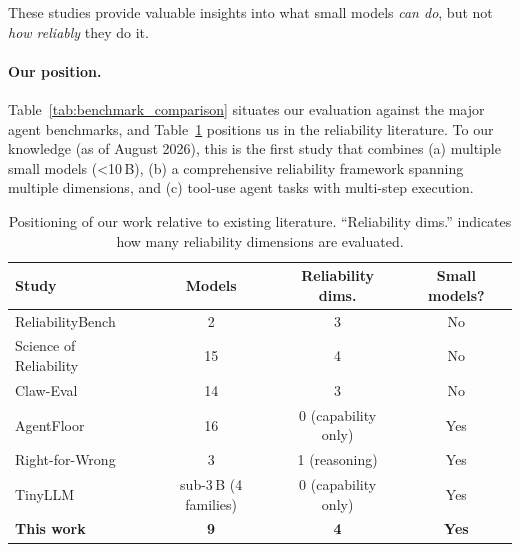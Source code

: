 These studies provide valuable insights into what small models \emph{can do}, but not \emph{how reliably} they do it.

\paragraph{Our position.}
Table~\ref{tab:benchmark_comparison} situates our evaluation against the major agent benchmarks, and Table~\ref{tab:position} positions us in the reliability literature. To our knowledge (as of August 2026), this is the first study that combines (a) multiple small models (\textless10\,B), (b) a comprehensive reliability framework spanning multiple dimensions, and (c) tool-use agent tasks with multi-step execution.

\begin{table}[t]
\centering
\caption{Positioning of our work relative to existing literature. 
         ``Reliability dims.'' indicates how many reliability dimensions are evaluated.}
\label{tab:position}
\small
\begin{tabular}{lccc}
\toprule
\textbf{Study} & \textbf{Models} & \textbf{Reliability dims.} & \textbf{Small models?} \\
\midrule
ReliabilityBench \cite{gupta2026reliabilitybench} & 2 & 3 & No \\
Science of Reliability \cite{rabanser2026science} & 15 & 4 & No \\
Claw-Eval \cite{claw2026eval} & 14 & 3 & No \\
AgentFloor \cite{karmakar2026agentfloor} & 16 & 0 (capability only) & Yes \\
Right-for-Wrong \cite{right2026wrong} & 3 & 1 (reasoning) & Yes \\
TinyLLM \cite{tinyllm2026edge} & sub-3\,B (4 families) & 0 (capability only) & Yes \\
\midrule
\textbf{This work} & \textbf{9} & \textbf{4} & \textbf{Yes} \\
\bottomrule
\end{tabular}
\end{table}

